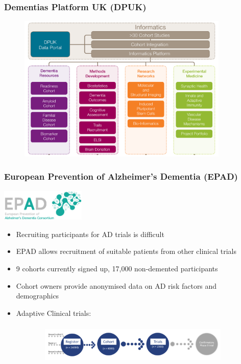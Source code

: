\documentclass[10pt,xcolor=table]{beamer}
\begin{document}
\begin{frame}
\frametitle{Dementias Platform UK (DPUK)}


\begin{figure}
\centering
\includegraphics[height=7cm,right]{DPUKdiagram}   
\end{figure}
\vspace{-4em}

\end{frame}

\begin{frame}
\frametitle{European Prevention of Alzheimer’s Dementia (EPAD)}

\includegraphics[height=1.5cm,right]{EPADlogo}  
\vspace{1em}
\begin{itemize}
 \item Recruiting participants for AD trials is difficult
 \item EPAD allows recruitment of suitable patients from other clinical trials
 \item 9 cohorts currently signed up, 17,000 non-demented participants
 \item Cohort owners provide anonymised data on AD risk factors and demographics
 \item Adaptive Clinical trials: 
\end{itemize}

\begin{figure}
\begin{subfigure}{1\textwidth}
\centering
\includegraphics[height=2cm,right]{epad_flow}  
\end{subfigure}
\end{figure}
\vspace{-1em}
\end{frame}
\end{document}
